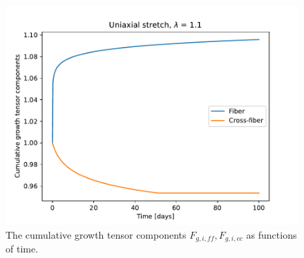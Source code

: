 \documentclass[a4paper,10pt]{article}
\begin{document}
\begin{figure}
  \centerline{
    \includegraphics{figs/cumulative_growth}
  }
\caption{The cumulative growth tensor components $F_{g,i,ff}, F_{g,i,cc}$ as functions of time.}
\label{fig:cum_growth_tensors}
\end{figure}
\end{document}
